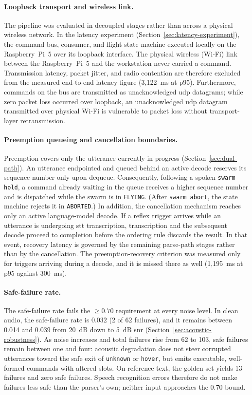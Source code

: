 \paragraph{Loopback transport and wireless link.} The pipeline was evaluated in decoupled stages rather
than across a physical wireless network. In the latency experiment
(Section~\ref{sec:latency-experiment}), the command bus, consumer, and flight state machine executed
locally on the Raspberry~Pi~5 over its loopback interface. The physical wireless (Wi-Fi) link between the
Raspberry~Pi~5 and the workstation never carried a command. Transmission latency, packet jitter, and
radio contention are therefore excluded from the measured end-to-end latency figure (3{,}122~ms at p95).
Furthermore, commands on the bus are transmitted as unacknowledged \gls{udp} datagrams; while zero packet
loss occurred over loopback, an unacknowledged \gls{udp} datagram transmitted over physical Wi-Fi is
vulnerable to packet loss without transport-layer retransmission.

\paragraph{Preemption queueing and cancellation boundaries.} Preemption covers only the utterance
currently in progress (Section~\ref{sec:dual-path}). An utterance endpointed and queued behind an active
decode reserves its sequence number only upon dequeue. Consequently, following a spoken \texttt{swarm hold},
a command already waiting in the queue receives a higher sequence number and is dispatched while the swarm
is in \texttt{FLYING}. (After \texttt{swarm abort}, the state machine rejects it in \texttt{ABORTED}.)
In addition, the cancellation mechanism reaches only an active language-model decode. If a reflex
trigger arrives while an utterance is undergoing \gls{stt} transcription, transcription and the
subsequent decode proceed to completion before the ordering rule discards the result. In that event,
recovery latency is governed by the remaining parse-path stages rather than by the cancellation. The
preemption-recovery criterion was measured only for triggers arriving during a decode, and it is missed
there as well (1{,}195~ms at p95 against 300~ms).

\paragraph{Safe-failure rate.} The safe-failure rate fails the $\geq 0.70$ requirement at every noise
level. In clean audio, the safe-failure rate is 0.032 (2 of 62 failures), and it remains between 0.014 and
0.039 from 20~dB down to 5~dB \gls{snr} (Section~\ref{sec:acoustic-robustness}). As noise increases and
total failures rise from 62 to 103, safe failures remain between one and four: acoustic degradation does
not steer corrupted utterances toward the safe exit of \texttt{unknown} or \texttt{hover}, but emits
executable, well-formed commands with altered slots. On reference text, the golden set yields 13
failures and zero safe failures. Speech recognition errors therefore do not make failures less safe than
the parser's own; neither input approaches the 0.70 bound.

